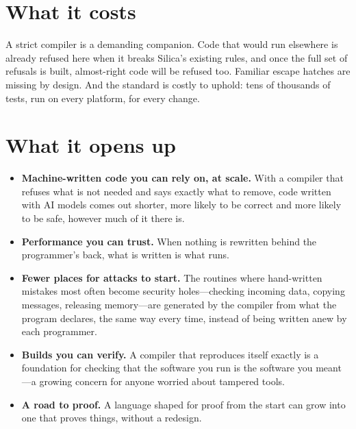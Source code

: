 \section{What it costs}

A strict compiler is a demanding companion. Code that would run elsewhere is
already refused here when it breaks Silica's existing rules, and once the full
set of refusals is built, almost-right code will be refused too. Familiar escape
hatches are missing by design. And the standard is costly to uphold: tens of
thousands of tests, run on every platform, for every change.

\section{What it opens up}

\begin{itemize}
  \item \textbf{Machine-written code you can rely on, at scale.} With a
        compiler that refuses what is not needed and says exactly what to
        remove, code written with AI models comes out shorter, more likely to
        be correct and more likely to be safe, however much of it there is.
  \item \textbf{Performance you can trust.} When nothing is rewritten behind
        the programmer's back, what is written is what runs.
  \item \textbf{Fewer places for attacks to start.} The routines where
        hand-written mistakes most often become security holes---checking
        incoming data, copying messages, releasing memory---are generated by
        the compiler from what the program declares, the same way every time,
        instead of being written anew by each programmer.
  \item \textbf{Builds you can verify.} A compiler that reproduces itself
        exactly is a foundation for checking that the software you run is the
        software you meant---a growing concern for anyone worried about
        tampered tools.
  \item \textbf{A road to proof.} A language shaped for proof from the start
        can grow into one that proves things, without a redesign.
\end{itemize}

